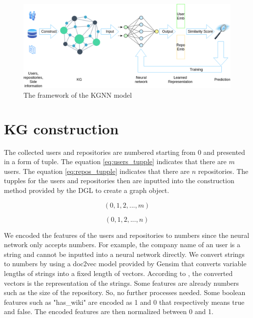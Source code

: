 \documentclass[11pt,twoside]{report}
\begin{document}
\begin{figure}[H]
    \centering
    \includegraphics[scale=0.4]{KGCN Overview.png}
    \caption{The framework of the KGNN model}
    \label{fig:kgnn_framework}
\end{figure}

\section{KG construction}
The collected users and repositories are numbered starting from 0 and presented in a form of tuple. The equation \ref{eq:users_tupple} indicates that there are $m$ users. The equation \ref{eq:repos_tupple} indicates that there are $n$ repositories. The tupples for the users and repositories then are inputted into the construction method provided by the DGL to create a graph object. 

\begin{equation}
    (0, 1, 2, ..., m)
    \label{eq:users_tupple}
\end{equation}

\begin{equation}
    (0, 1, 2, ..., n)
    \label{eq:repos_tupple}
\end{equation}

We encoded the features of the users and repositories to numbers since the neural network only accepts numbers. For example, the company name of an user is a string and cannot be inputted into a neural network directly. We convert strings to numbers by using a doc2vec model \cite{le_distributed_nodate} provided by Gensim \cite{rehurek_lrec} that converts variable lengths of strings into a fixed length of vectors. According to \cite{mikolov_efficient_2013}, the converted vectors is the representation of the strings. Some features are already numbers such as the size of the repository. So, no further processes needed. Some boolean features such as "has\_wiki" are encoded as 1 and 0 that respectively means true and false. The encoded features are then normalized between 0 and 1.
\end{document}
